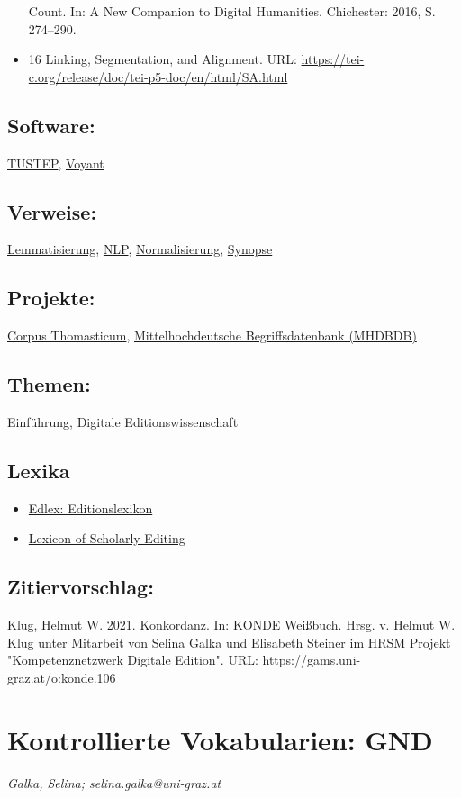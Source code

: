 \documentclass{article}
\begin{document}
\begin{itemize}
                              Count. In: A New Companion to Digital Humanities. Chichester: 2016, S. 274–290.\item 16 Linking, Segmentation, and Alignment. URL: \url{https://tei-c.org/release/doc/tei-p5-doc/en/html/SA.html}\end{itemize}\subsection*{Software:}\href{http://www.tustep.uni-tuebingen.de/}{TUSTEP}, \href{https://voyant-tools.org/}{Voyant}\subsection*{Verweise:}\href{https://gams.uni-graz.at/o:konde.115}{Lemmatisierung}, \href{https://gams.uni-graz.at/o:konde.145}{NLP}, \href{https://gams.uni-graz.at/o:konde.146}{Normalisierung}, \href{https://gams.uni-graz.at/o:konde.174}{Synopse}\subsection*{Projekte:}\href{https://www.corpusthomisticum.org/wintrode.html}{Corpus
                           Thomasticum}, \href{http://mhdbdb.sbg.ac.at/}{Mittelhochdeutsche
                           Begriffsdatenbank (MHDBDB)}\subsection*{Themen:}Einführung, Digitale Editionswissenschaft\subsection*{Lexika}\begin{itemize}\item \href{https://edlex.de/index.php?title=Konkordanz}{Edlex: Editionslexikon}\item \href{https://lexiconse.uantwerpen.be/index.php/lexicon/concordance/}{Lexicon of Scholarly Editing}\end{itemize}\subsection*{Zitiervorschlag:}Klug, Helmut W. 2021. Konkordanz. In: KONDE Weißbuch. Hrsg. v. Helmut W. Klug unter Mitarbeit von Selina Galka und Elisabeth Steiner im HRSM Projekt "Kompetenznetzwerk Digitale Edition". URL: https://gams.uni-graz.at/o:konde.106\newpage\section*{Kontrollierte Vokabularien: GND} \emph{Galka, Selina; selina.galka@uni-graz.at}\\
        
\end{document}
